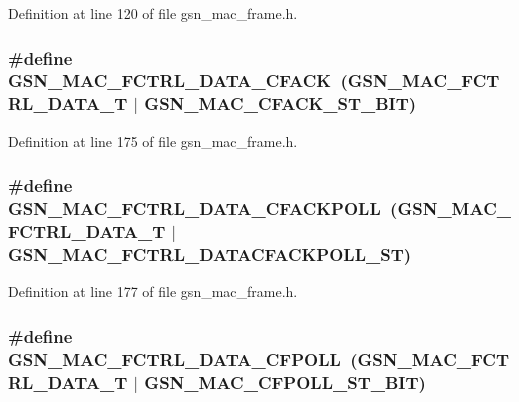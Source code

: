 Definition at line 120 of file gsn\_\-mac\_\-frame.h.

\hypertarget{a00523_a8939fd8ec06bdbf55fb5879bd9302600}{
\subsubsection[{GSN\_\-MAC\_\-FCTRL\_\-DATA\_\-CFACK}]{\setlength{\rightskip}{0pt plus 5cm}\#define GSN\_\-MAC\_\-FCTRL\_\-DATA\_\-CFACK~(GSN\_\-MAC\_\-FCTRL\_\-DATA\_\-T    $|$ GSN\_\-MAC\_\-CFACK\_\-ST\_\-BIT)}}
\label{a00523_a8939fd8ec06bdbf55fb5879bd9302600}


Definition at line 175 of file gsn\_\-mac\_\-frame.h.

\hypertarget{a00523_a1b2e2f110a171d9813e46a07592e218a}{
\subsubsection[{GSN\_\-MAC\_\-FCTRL\_\-DATA\_\-CFACKPOLL}]{\setlength{\rightskip}{0pt plus 5cm}\#define GSN\_\-MAC\_\-FCTRL\_\-DATA\_\-CFACKPOLL~(GSN\_\-MAC\_\-FCTRL\_\-DATA\_\-T    $|$ GSN\_\-MAC\_\-FCTRL\_\-DATACFACKPOLL\_\-ST)}}
\label{a00523_a1b2e2f110a171d9813e46a07592e218a}


Definition at line 177 of file gsn\_\-mac\_\-frame.h.

\hypertarget{a00523_a411680124b2b73dd7f2c6e19ebdf8783}{
\subsubsection[{GSN\_\-MAC\_\-FCTRL\_\-DATA\_\-CFPOLL}]{\setlength{\rightskip}{0pt plus 5cm}\#define GSN\_\-MAC\_\-FCTRL\_\-DATA\_\-CFPOLL~(GSN\_\-MAC\_\-FCTRL\_\-DATA\_\-T    $|$ GSN\_\-MAC\_\-CFPOLL\_\-ST\_\-BIT)}}
\label{a00523_a411680124b2b73dd7f2c6e19ebdf8783}


